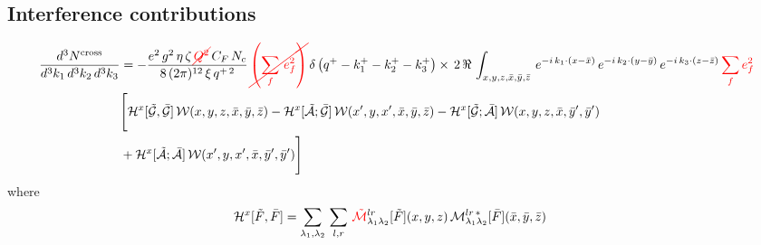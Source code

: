 \documentclass[9pt]{article}
\newcommand{\chg}[1]{{\color{red}#1}}
\newcommand{\del}[1]{{\color{red}\cancel{#1}}}
\numberwithin{equation}{section}
\begin{document}
\subsection{Interference contributions} 
\begin{align}
     \frac{d^{3}N^{\text{cross}}}{d^{3}k_{1}\,d^{3}k_{2}\, d^{3}k_{3}} & = -\frac{e^{2}\,g^{2}\,\eta\,\zeta\,\del{Q^{2}}\,C_{F}\,N_{c}}{8\, (2\pi)^{12}\,\xi\,q^{+\,2}}\, \del{\left(\sum_{f}\, e^{2}_{f}\right)}\, \delta\left(q^{+}-k^{+}_{1}-k^{+}_{2}-k^{+}_{3}\right)\times\, 2\,\mathcal{\Re}\,\int_{x,y,z,\Bar{x},\Bar{y},\Bar{z}}\, e^{-i\,k_{1}\cdot (x-\Bar{x})}\, e^{-i\,k_{2}\cdot (y-\Bar{y})}\, e^{-i\,k_{3}\cdot (z-\Bar{z})}\,\chg{\sum_{f}e^{2}_{f}}\notag \\ &  \Bigg[\mathcal{H}^{x}[\mathcal{\Tilde{G}},\Bar{\mathcal{G}}]\,\mathcal{W}(x,y,z,\Bar{x},\Bar{y},\Bar{z})-\mathcal{H}^{x}[\Tilde{\mathcal{A}};\Bar{\mathcal{G}}]\,\mathcal{W}(x',y,x',\Bar{x},\Bar{y},\Bar{z})-\mathcal{H}^{x}[\Tilde{\mathcal{G}};\Bar{\mathcal{A}}]\,\mathcal{W}(x,y,z,\Bar{x},\Bar{y}',\Bar{y}')\notag \\ & +\mathcal{H}^{x}[\Tilde{\mathcal{A}};\Bar{\mathcal{A}}]\,\mathcal{W}(x',y,x',\Bar{x},\Bar{y}',\Bar{y}')\Bigg]
\label{chg:Q2x}\end{align}  
where
\begin{align}
    \mathcal{H}^{x} [\Tilde{F},\Bar{F}] & = \sum_{\lambda_{1},\lambda_{2}}\, \sum_{l,r}\, \chg{\mathcal{\Tilde{M}}}^{lr}_{\lambda_{1}\lambda_{2}}[\Tilde{F}](x,y,z)\,\mathcal{M}^{lr\,*}_{\lambda_{1}\lambda_{2}}[\Bar{F}] (\Bar{x},\Bar{y},\Bar{z})
\label{chg:Mbar}\end{align}
\end{document}
